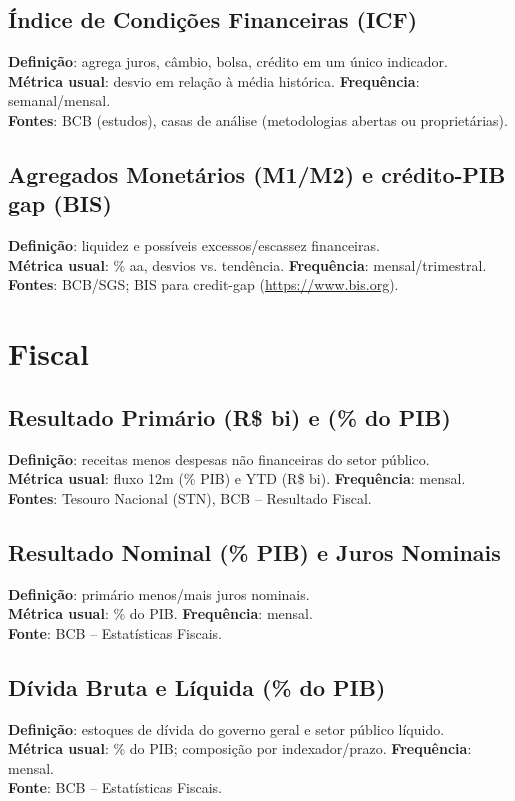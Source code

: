 \documentclass[11pt,a4paper]{article}
\begin{document}
\subsection*{Índice de Condições Financeiras (ICF)}
\textbf{Definição}: agrega juros, câmbio, bolsa, crédito em um único indicador.\\
\textbf{Métrica usual}: desvio em relação à média histórica. \textbf{Frequência}: semanal/mensal.\\
\textbf{Fontes}: BCB (estudos), casas de análise (metodologias abertas ou proprietárias).

\subsection*{Agregados Monetários (M1/M2) e crédito-PIB gap (BIS)}
\textbf{Definição}: liquidez e possíveis excessos/escassez financeiras.\\
\textbf{Métrica usual}: \% aa, desvios vs. tendência. \textbf{Frequência}: mensal/trimestral.\\
\textbf{Fontes}: BCB/SGS; BIS para credit-gap (\url{https://www.bis.org}).

\section{Fiscal}
\subsection*{Resultado Primário (R\$ bi) e (\% do PIB)}
\textbf{Definição}: receitas menos despesas não financeiras do setor público.\\
\textbf{Métrica usual}: fluxo 12m (\% PIB) e YTD (R\$ bi). \textbf{Frequência}: mensal.\\
\textbf{Fontes}: Tesouro Nacional (STN), BCB -- Resultado Fiscal.

\subsection*{Resultado Nominal (\% PIB) e Juros Nominais}
\textbf{Definição}: primário menos/mais juros nominais.\\
\textbf{Métrica usual}: \% do PIB. \textbf{Frequência}: mensal.\\
\textbf{Fonte}: BCB -- Estatísticas Fiscais.

\subsection*{Dívida Bruta e Líquida (\% do PIB)}
\textbf{Definição}: estoques de dívida do governo geral e setor público líquido.\\
\textbf{Métrica usual}: \% do PIB; composição por indexador/prazo. \textbf{Frequência}: mensal.\\
\textbf{Fonte}: BCB -- Estatísticas Fiscais.
\end{document}
